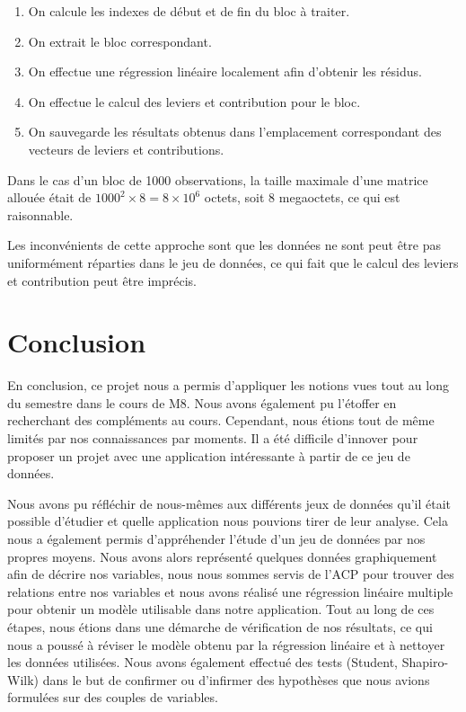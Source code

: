 \documentclass[a4paper, 12pt]{report}
\begin{document}
\begin{enumerate}
    \item On calcule les indexes de début et de fin du bloc à traiter.
    \item On extrait le bloc correspondant.
    \item On effectue une régression linéaire localement afin d'obtenir les résidus.
    \item On effectue le calcul des leviers et contribution pour le bloc.
    \item On sauvegarde les résultats obtenus dans l'emplacement correspondant des vecteurs de leviers et contributions.
\end{enumerate}

Dans le cas d'un bloc de 1000 observations, la taille maximale d'une matrice allouée était de \(1000^{2}\times 8 = 8 \times 10^{6}\) octets, soit 8 megaoctets, ce qui est raisonnable.

Les inconvénients de cette approche sont que les données ne sont peut être pas uniformément réparties dans le jeu de données, ce qui fait que le calcul des leviers et contribution peut être imprécis.

\chapter{Conclusion}

En conclusion, ce projet nous a permis d'appliquer les notions vues tout au long du semestre dans le cours de M8. Nous avons également pu l'étoffer en recherchant des compléments au cours. Cependant, nous étions tout de même limités par nos connaissances par moments. Il a été difficile d'innover pour proposer un projet avec une application intéressante à partir de ce jeu de données. 

Nous avons pu réfléchir de nous-mêmes aux différents jeux de données qu'il était possible d'étudier et quelle application nous pouvions tirer de leur analyse. Cela nous a également permis d'appréhender l'étude d'un jeu de données par nos propres moyens. Nous avons alors représenté quelques données graphiquement afin de décrire nos variables, nous nous sommes servis de l'ACP pour trouver des relations entre nos variables et nous avons réalisé une régression linéaire multiple pour obtenir un modèle utilisable dans notre application. Tout au long de ces étapes, nous étions dans une démarche de vérification de nos résultats, ce qui nous a poussé à réviser le modèle obtenu par la régression linéaire et à nettoyer les données utilisées. Nous avons également effectué des tests (Student, Shapiro-Wilk) dans le but de confirmer ou d'infirmer des hypothèses que nous avions formulées sur des couples de variables.
\end{document}
